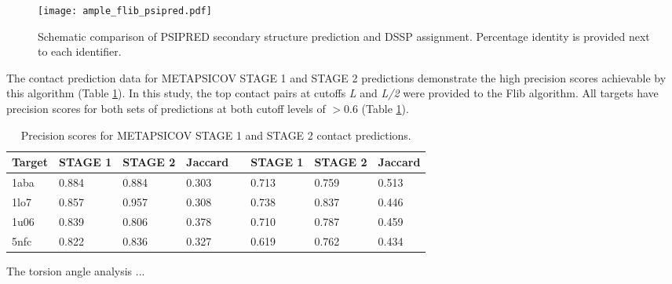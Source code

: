 \begin{figure}[H]
	\centering
	\texttt{[image: ample\_flib\_psipred.pdf]}
	\caption{Schematic comparison of PSIPRED \cite{Jones1999-fi} secondary structure prediction and DSSP \cite{Frishman1995-ns} assignment. Percentage identity is provided next to each identifier.}
	\label{fig:ample_flib_psipred}
\end{figure}

The contact prediction data for METAPSICOV STAGE 1 and STAGE 2 predictions demonstrate the high precision scores achievable by this algorithm (Table \ref{table:ample_flib_contact_precision}). In this study, the top contact pairs at cutoffs \textit{L} and \textit{L/2} were provided to the Flib algorithm. All targets have precision scores for both sets of predictions at both cutoff levels of $>0.6$ (Table \ref{table:ample_flib_contact_precision}).

\begin{table}[H]
  \centering
  \begin{tabularx}{\textwidth}{|X|X|X|X|X|X|X|X|}
      \hline
	  \textbf{Target} & \textbf{STAGE 1} & \textbf{STAGE 2} & \textbf{Jaccard} && \textbf{STAGE 1} & \textbf{STAGE 2} & \textbf{Jaccard} \\ \hline
	  1aba	&	0.884	&	0.884	&	0.303	&&	0.713	&	0.759	&	0.513	\\ \hline
	  1lo7	&	0.857	&	0.957	&	0.308	&&	0.738	&	0.837	&	0.446	\\ \hline
	  1u06	&	0.839	&	0.806	&	0.378	&&	0.710	&	0.787	&	0.459	\\ \hline
	  5nfc	&	0.822	&	0.836	&	0.327	&&	0.619	&	0.762	&	0.434	\\ \hline
  \end{tabularx}
  \caption{Precision scores for METAPSICOV \cite{Jones2015-wp} STAGE 1 and STAGE 2 contact predictions.}
  \label{table:ample_flib_contact_precision}
\end{table}

The torsion angle analysis ...





